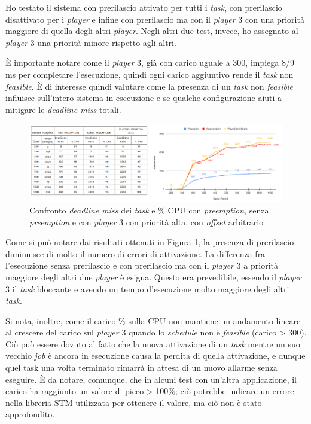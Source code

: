 \documentclass{article}
\begin{document}
Ho testato il sistema con prerilascio attivato per tutti i \textit{task}, con prerilascio disattivato per i \textit{player} e infine con prerilascio ma con il \textit{player} 3 con una priorità maggiore di quella degli altri \textit{player}. Negli altri due test, invece, ho assegnato  al \textit{player} 3 una priorità minore rispetto agli altri.

È importante notare come il \textit{player} 3, già con carico uguale a 300, impiega 8/9 ms per completare l'esecuzione, quindi ogni carico aggiuntivo rende il \textit{task} non \textit{feasible}. È di interesse quindi valutare come la presenza di un \textit{task} non \textit{feasible} influisce sull'intero sistema in esecuzione e se qualche configurazione aiuti a mitigare le \textit{deadline miss} totali.
\begin{figure}[H]
	\centering
	\includegraphics[width=6in]{image/CARICO-OFFSET.png}
	\caption{Confronto \textit{deadline miss} dei \textit{task} e \% CPU con \textit{preemption}, senza \textit{preemption} e con \textit{player} 3 con priorità alta, con \textit{offset} arbitrario}
	\label{siC-siO}
\end{figure}
Come si può notare dai risultati ottenuti in Figura \ref{siC-siO}, la presenza di prerilascio diminuisce di molto il numero di errori di attivazione. La differenza fra l'esecuzione senza prerilascio e con prerilascio ma con il \textit{player} 3 a priorità maggiore degli altri due \textit{player} è esigua. Questo era prevedibile, essendo il \textit{player} 3 il \textit{task} bloccante e avendo un tempo d'esecuzione molto maggiore degli altri \textit{task}. 

Si nota, inoltre, come il carico \% sulla CPU non mantiene un andamento lineare al crescere del carico sul \textit{player} 3 quando lo \textit{schedule} non è \textit{feasible} (carico > 300). Ciò può essere dovuto al fatto che la nuova attivazione di un \textit{task} mentre un suo vecchio \textit{job} è ancora in esecuzione causa la perdita di quella attivazione, e dunque quel task una volta terminato rimarrà in attesa di un nuovo allarme senza eseguire. È da notare, comunque, che in alcuni test con un'altra applicazione, il carico ha raggiunto un valore di picco > 100\%; ciò potrebbe indicare un errore nella libreria STM utilizzata per ottenere il valore, ma ciò non è stato approfondito.
\end{document}
